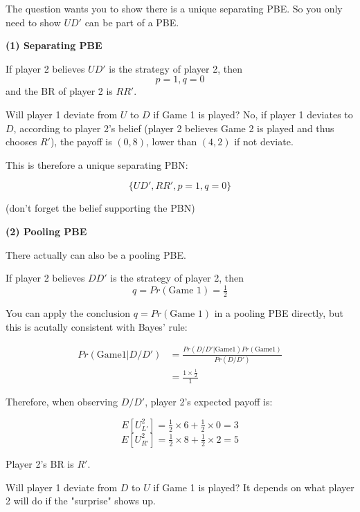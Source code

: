 \documentclass{article}
\begin{document}
\begin{mdframed}[backgroundcolor=blue!20,linecolor=white]
\medskip

The question wants you to show there is a unique separating PBE. So you only need to show $UD'$ can be part of a PBE.

\bigskip

\textbf{(1) Separating PBE}

\medskip

If player 2 believes $UD'$ is the strategy of player 2, then
$$p=1, q=0$$
and the BR of player 2 is $RR'$.

\medskip

Will player 1 deviate from $U$ to $D$ if Game 1 is played? No, if player 1
deviates to $D$, according to player 2's belief (player 2 believes Game 2 is played and thus chooses $R'$), the payoff is $(0,8)$, lower than $(4,2)$ if not deviate.

\medskip

This is therefore a unique separating PBN:

$$\{UD',RR',p=1,q=0\}$$

(don't forget the belief supporting the PBN)

\bigskip

\textbf{(2) Pooling PBE}

\medskip

There actually can also be a pooling PBE.

\medskip

If player 2 believes $DD'$ is the strategy of player 2, then
$$q=Pr(\text{Game 1})=\tfrac12$$

\medskip

You can apply the conclusion $q=Pr(\text{Game 1})$ in a pooling PBE directly, but this is acutally consistent with Bayes' rule:

\begin{align*}
Pr(\text{Game1} | D/D') &= \frac{Pr(D/D'|\text{Game1}) Pr(\text{Game1})}{Pr(D/D')} \\
&= \frac{1 \times \tfrac12}{1}
\end{align*}

Therefore, when observing $D/D'$, player 2's expected payoff is:

$$E[U^2_{L'}] = \tfrac12 \times 6+ \tfrac12 \times 0 = 3$$
$$E[U^2_{R'}] = \tfrac12 \times 8+ \tfrac12 \times 2 = 5$$

Player 2's BR is $R'$.

\medskip

Will player 1 deviate from $D$ to $U$ if Game 1 is played? It depends on what player 2 will do if the "surprise" shows up.


\end{mdframed}
\end{document}

